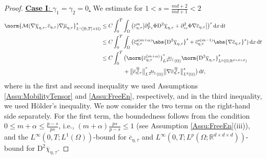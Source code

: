 \documentclass[a4paper,12pt]{article}
\newcommand{\R}{\mathbb{R}}
\newcommand{\calM}{\mathcal{M}}
\newcommand{\pl}{\partial}
\newcommand{\dx}{\mathrm{\,d}x}
\newcommand{\dt}{\mathrm{\,d}t}
\newcommand{\chibar}{\overline{\chi}}
\newcommand{\mubar}{\overline{\mu}}
\newcommand{\cbar}{\overline{c}}
\newcommand{\rmD}{\mathrm{D}}
\theoremstyle{plain}
\theoremstyle{definition}
\numberwithin{equation}{section}
\begin{document}
\begin{proof}
 \underline{\textbf{Case I}: $\gamma_1=\gamma_2=0$.} We estimate for $1<s=\frac{md+2}{md+1}<2$
\begin{align*}
    \norm{\calM(\nabla\chibar_{\eta,\tau},\cbar_{\eta,\tau})\nabla\mubar_{\eta,\tau}}_{L^s([0,T]\times\Omega)}^s 
	&\leq C\int_0^T\int_\Omega \big(\cbar^m_{\eta,\tau}\big|\pl_{Fc}^2\Phi \rmD^2\chibar_{\eta,\tau} 
	+ \pl_{cc}^2\Phi\nabla \cbar_{\eta,\tau}\big|\big)^s\dx\dt\\
    &\leq C\int_0^T\int_\Omega \big(\cbar_{\eta,\tau}^{s(m+\alpha)}\abs{\rmD^2\chibar_{\eta,\tau}}^s + \cbar_{\eta,\tau}^{s(m-1)}\abs{\nabla \cbar_{\eta,\tau}}^s)\dx\dt\\  
    &\leq C\int_0^T\big(\norm{\cbar^{(m+\alpha)}_{\eta,\tau}}^s_{L^{\frac{ps}{p-s}}(\Omega)}\norm{\rmD^2\chibar_{\eta,\tau}}^s_{L^p(\Omega;\R^{d\times d\times d})} \\
    &\qquad\qquad + \big\|{\cbar^{\frac{m}{2}}_{\eta,\tau}\big\|}^s_{L^\frac{2s}{2-s}(\Omega)}\big\|{\nabla \cbar_{\eta,\tau}^{\frac{m}{2}}}\big\|^s_{L^2(\Omega)}\big)\dt,
\end{align*}
where in the first and second inequality we used Assumptions \ref{Assu:MobilityTensor} and \ref{Assu:FreeEn},
respectively, and in the third inequality, we used H\"older's inequality. We now consider the two terms on the right-hand
side separately. 
For the first term, the boundedness follows from the condition $0\leq m+\alpha \leq \frac{p-s}{ps}$, 
i.e., $(m+\alpha)\frac{ps}{p-s}\leq 1$ (see Assumption \ref{Assu:FreeEn}(iii)), and the $L^\infty(0,T;L^1(\Omega))$-bound for $\cbar_{\eta,\tau}$ and $L^\infty(0,T;L^p(\Omega;\R^{d\times d\times d}))$-bound for $\rmD^2\chibar_{\eta,\tau}$.  


\end{proof}
\end{document}
